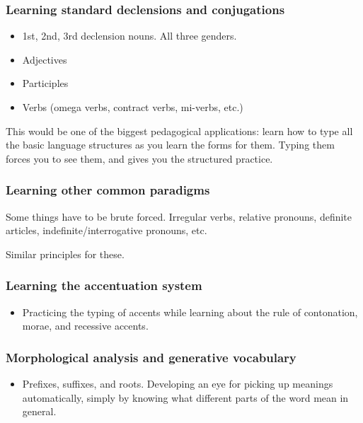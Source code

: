 \documentclass[11pt]{article}
\begin{document}
\subsubsection{Learning standard declensions and conjugations}
\label{sec:orgbd9f883}

\begin{itemize}
\item 1st, 2nd, 3rd declension nouns. All three genders.
\item Adjectives
\item Participles
\item Verbs (omega verbs, contract verbs, mi-verbs, etc.)
\end{itemize}

This would be one of the biggest pedagogical applications: learn how to type all the basic language structures as you learn the forms for them. Typing them forces you to see them, and gives you the structured practice.

\subsubsection{Learning other common paradigms}
\label{sec:orgaefe3e6}

Some things have to be brute forced. Irregular verbs, relative pronouns, definite articles, indefinite/interrogative pronouns, etc.

Similar principles for these.

\subsubsection{Learning the accentuation system}
\label{sec:org61ddc94}

\begin{itemize}
\item Practicing the typing of accents while learning about the rule of contonation, morae, and recessive accents.
\end{itemize}

\subsubsection{Morphological analysis and generative vocabulary}
\label{sec:org5c5d2f5}

\begin{itemize}
\item Prefixes, suffixes, and roots. Developing an eye for picking up meanings automatically, simply by knowing what different parts of the word mean in general.
\end{itemize}
\end{document}
